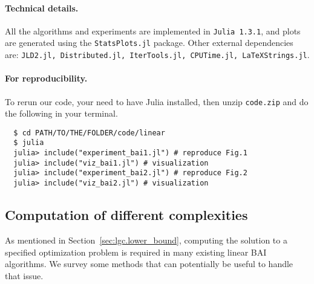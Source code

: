 \paragraph{Technical details.} All the algorithms and experiments are implemented in \lstinline{Julia 1.3.1}, and plots are generated using the \lstinline{StatsPlots.jl} package. Other external dependencies are: \lstinline{JLD2.jl, Distributed.jl, IterTools.jl, CPUTime.jl, LaTeXStrings.jl}.

\paragraph{For reproducibility.} To rerun our code, your need to have Julia installed, then unzip \lstinline{code.zip} and do the following in your terminal.

\begin{lstlisting}
  $ cd PATH/TO/THE/FOLDER/code/linear
  $ julia
  julia> include("experiment_bai1.jl") # reproduce Fig.1
  julia> include("viz_bai1.jl") # visualization
  julia> include("experiment_bai2.jl") # reproduce Fig.2
  julia> include("viz_bai2.jl") # visualization
\end{lstlisting}

%

\subsection{Computation of different complexities}\label{app:lgc.implem_complexity}

As mentioned in Section~\ref{sec:lgc.lower_bound}, computing the solution to a specified optimization problem is required in many existing linear BAI algorithms. We survey some methods that can potentially be useful to handle that issue.

